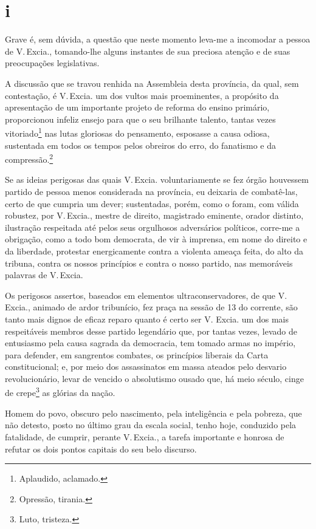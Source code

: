 \section{i}

Grave é, sem dúvida, a questão que neste momento leva-me a incomodar a
pessoa de V.\,Excia., tomando-lhe alguns instantes de sua preciosa
atenção e de suas preocupações legislativas.

A discussão que se travou renhida na Assembleia desta província, da
qual, sem contestação, é V.\,Excia. um dos vultos mais proeminentes, a
propósito da apresentação de um importante projeto de reforma do ensino
primário, proporcionou infeliz ensejo para que o seu brilhante talento,
tantas vezes vitoriado\footnote{Aplaudido, aclamado.} nas lutas
gloriosas do pensamento, esposasse a causa odiosa, sustentada em todos
os tempos pelos obreiros do erro, do fanatismo e da
compressão.\footnote{Opressão, tirania.}

Se as ideias perigosas das quais V.\,Excia. voluntariamente se fez órgão
houvessem partido de pessoa menos considerada na província, eu deixaria
de combatê-las, certo de que cumpria um dever; sustentadas, porém, como
o foram, com válida robustez, por V.\,Excia., mestre de direito,
magistrado eminente, orador distinto, ilustração respeitada até pelos
seus orgulhosos adversários políticos, corre-me a obrigação, como a todo
bom democrata, de vir à imprensa, em nome do direito e da liberdade,
protestar energicamente contra a violenta ameaça feita, do alto da
tribuna, contra os nossos princípios e contra o nosso partido, nas
memoráveis palavras de V.\,Excia.

Os perigosos assertos, baseados em elementos ultraconservadores, de que
V.\,Excia., animado de ardor tribunício, fez praça na sessão de 13 do
corrente, são tanto mais dignos de eficaz reparo quanto é certo ser V.
Excia. um dos mais respeitáveis membros desse partido legendário que,
por tantas vezes, levado de entusiasmo pela causa sagrada da democracia,
tem tomado armas no império, para defender, em sangrentos combates, os
princípios liberais da Carta constitucional; e, por meio dos
assassinatos em massa ateados pelo desvario revolucionário, levar de
vencido o absolutismo ousado que, há meio século, cinge de
crepe\footnote{Luto, tristeza.} as glórias da nação.

Homem do povo, obscuro pelo nascimento, pela inteligência e pela
pobreza, que não detesto, posto no último grau da escala social, tenho
hoje, conduzido pela fatalidade, de cumprir, perante V.\,Excia., a tarefa
importante e honrosa de refutar os dois pontos capitais do seu belo
discurso.

